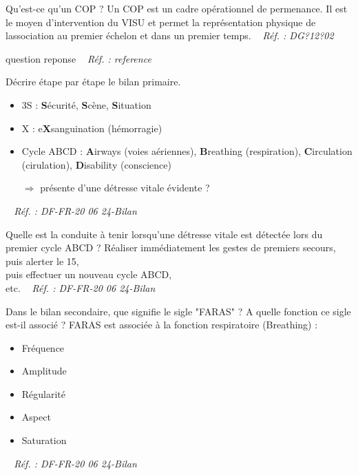 \documentclass[grid,avery5371,landscape]{flashcards}
\makeatletter
\newcounter{nocarte}
\newcommand{\categ}[1]{%
  \def\@categ{#1}%
  \setcounter{nocarte}{0}%
}
\newcommand{\source}[1]{%
  \medskip
  \itshape%
   ~ \hfill Réf. : #1}
\makeatother
\begin{document}
\color[HTML]{01DF01}
\categ{CE-CP-REG}
\begin{flashcard}[administratif]{
 Qu'est-ce qu'un COP ?   }
  Un COP est un cadre opérationnel de permenance. Il est le moyen d'intervention du VISU et permet la représentation physique de lassociation au premier
échelon et dans un premier temps.
  \source{DG?12?02}
\end{flashcard}


\color[HTML]{FF0000}
\categ{domaine}
\begin{flashcard}[type]{
 question   }
  reponse
  \source{reference}
\end{flashcard}


\color[HTML]{003273}
\categ{PSE}
\begin{flashcard}[bilan]{
 Décrire étape par étape le bilan primaire.   }
  \begin{itemize}
  \item 3S : \textbf{S}écurité, \textbf{S}cène, \textbf{S}ituation 
  \item X : e\textbf{X}sanguination (hémorragie)
\item Cycle ABCD : \textbf{A}irways (voies aériennes), \textbf{B}reathing (respiration), \textbf{C}irculation (cirulation), \textbf{D}isability (conscience)
  \item[ $\Rightarrow$] présente d'une détresse vitale évidente ?
\end{itemize}
  \source{DF-FR-20 06 24-Bilan}
\end{flashcard}


\color[HTML]{003273}
\categ{PSE}
\begin{flashcard}[bilan]{
 Quelle est la conduite à tenir lorsqu'une détresse vitale est détectée lors du premier cycle ABCD ?   }
  Réaliser immédiatement les gestes de premiers secours, \\ puis alerter le 15, \\ puis effectuer un nouveau cycle ABCD, \\ etc.
  \source{DF-FR-20 06 24-Bilan}
\end{flashcard}


\color[HTML]{003273}
\categ{PSE}
\begin{flashcard}[bilan]{
 Dans le bilan secondaire, que signifie le sigle "FARAS" ? A quelle fonction ce sigle est-il associé ?   }
  FARAS est associée à la fonction respiratoire (Breathing) :
\begin{itemize} \item Fréquence \item Amplitude \item Régularité\item Aspect \item Saturation \end{itemize}
  \source{DF-FR-20 06 24-Bilan}
\end{flashcard}
\end{document}
